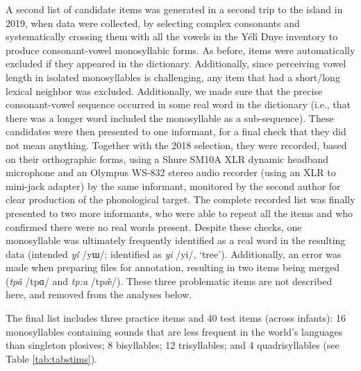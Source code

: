 \documentclass[
  american,
  ,man,floatsintext]{apa6}
\begin{document}
A second list of candidate items was generated in a second trip to the island in 2019, when data were collected, by selecting complex consonants and systematically crossing them with all the vowels in the Yélî Dnye inventory to produce consonant-vowel monosyllabic forms. As before, items were automatically excluded if they appeared in the dictionary. Additionally, since perceiving vowel length in isolated monosyllables is challenging, any item that had a short/long lexical neighbor was excluded. Additionally, we made sure that the precise consonant-vowel sequence occurred in some real word in the dictionary (i.e., that there was a longer word included the monosyllable as a sub-sequence). These candidates were then presented to one informant, for a final check that they did not mean anything. Together with the 2018 selection, they were recorded, based on their orthographic forms, using a Shure SM10A XLR dynamic headband microphone and an Olympus WS-832 stereo audio recorder (using an XLR to mini-jack adapter) by the same informant, monitored by the second author for clear production of the phonological target. The complete recorded list was finally presented to two more informants, who were able to repeat all the items and who confirmed there were no real words present. Despite these checks, one monosyllable was ultimately frequently identified as a real word in the resulting data (intended \emph{yî} /yɯ/; identified as \emph{yi} /yi/, `tree'). Additionally, an error was made when preparing files for annotation, resulting in two items being merged (\emph{tpâ} /tpɑ/ and \emph{tp:a} /tpæ̃/). These three problematic items are not described here, and removed from the analyses below.

The final list includes three practice items and 40 test items (across infants): 16 monosyllables containing sounds that are less frequent in the world's languages than singleton plosives; 8 bisyllables; 12 trisyllables; and 4 quadrisyllables (see Table \ref{tab:tabstims}).
\end{document}
